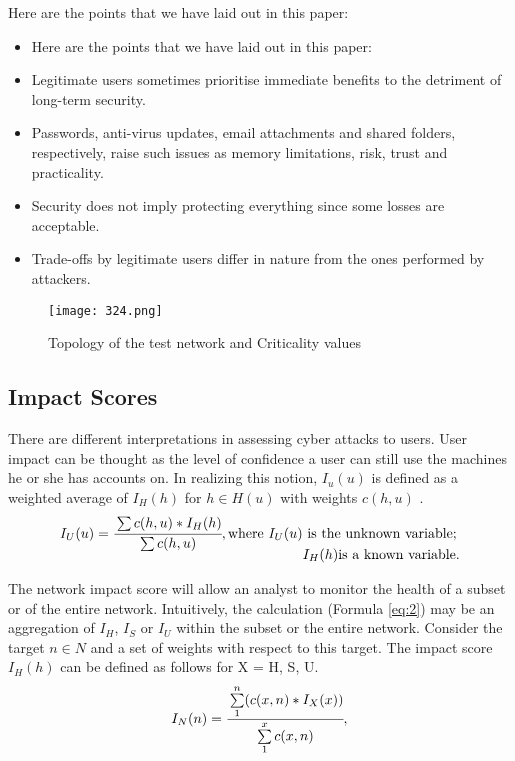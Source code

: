 \documentclass[preprint]{oscmjournal}
\begin{document}
Here are the points that we have laid out in this paper:
\begin{itemize}
    \item Here are the points that we have laid out in this paper:
    \item Legitimate users sometimes prioritise immediate benefits to the detriment of long-term security. 
    \item Passwords, anti-virus updates, email attachments and shared folders, respectively, raise such issues as memory limitations, risk, trust and practicality. 
    \item Security does not imply protecting everything since some losses are acceptable.  
    \item Trade-offs by legitimate users differ in nature from the ones performed by attackers. 
\end{itemize}

\begin{figure}[h]
    \centering
    \texttt{[image: 324.png]}
    \caption{Topology of the test network and Criticality values}
    \label{fig2:enter-label}
\end{figure}


\newpage
\subsection{Impact Scores}
There are different interpretations in assessing cyber attacks to users. User impact can be thought as the level of confidence a user can still use the machines he or she has accounts on. In realizing this notion, $I_u(u)$  is defined as a weighted average of $I_H(h)$ for $h \in H(u)$  with weights $c(h, u)$ .
\begin{equation}
\label{eq:1}
   I_U(u)=\cfrac{\sum c(h, u)*I_H(h)}{\sum c(h,u)},
   \begin{aligned}[t]
        \text{where } I_U(u) & \text{ is the unknown variable;} \\
                        & I_H(h)\text{is a known variable.}
    \end{aligned}
\end{equation}


The network impact score will allow an analyst to monitor the health of a subset or of the entire network. Intuitively, the calculation (Formula \ref{eq:2}) may be an aggregation of $I_H$, $I_S$ or $I_U$  within the subset or the entire network. Consider the target $n\in N$ and a set of weights with respect to this target. The impact score $I_H(h)$ can be defined as follows for X = H, S, U.
\begin{equation}
\label{eq:2}
    I_N(n)=\cfrac{\sum\limits_{1}^n (c(x, n)*I_X(x))}{\sum\limits_{1}^x c(x,n)},
\end{equation}
\end{document}
